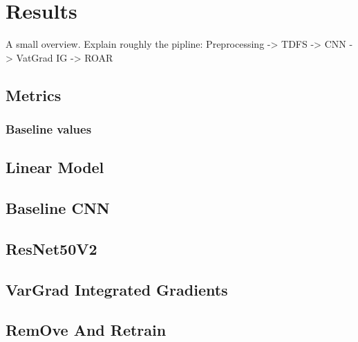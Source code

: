 \chapter{Results}
\label{ch:results}

A small overview. Explain roughly the pipline: Preprocessing -> TDFS -> CNN -> VatGrad IG -> ROAR

\section{Metrics}
\label{sec:results:metrics}

\subsection{Baseline values}
\label{sec:results:bl_values}

\section{Linear Model}
\label{sec:results:lm}

\section{Baseline CNN}
\label{sec:results:bl_cnn}

\section{ResNet50V2}
\label{sec:results:RN50V2}

\section{VarGrad Integrated Gradients}
\label{sec:results:VarGrad_IG}

\section{RemOve And Retrain}
\label{sec:results:ROAR}

